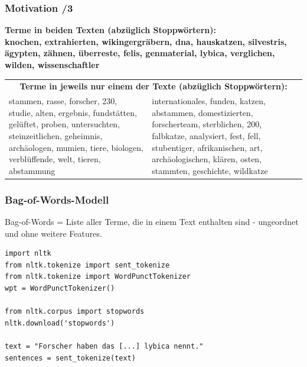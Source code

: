     \begin{frame}
    \frametitle{Motivation /3}
    \begin{center}
    \scriptsize{\textbf{Terme in beiden Texten (abzüglich Stoppwörtern):\\knochen, extrahierten, wikingergräbern, dna, hauskatzen, silvestris, ägypten, zähnen, überreste, felis, genmaterial, lybica, verglichen, wilden, wissenschaftler}}
    \end{center}
    
    \begin{table}[htp]
    \begin{center}
    \begin{tabular}{p{5cm}p{5cm}}
    \multicolumn{2}{c}{\scriptsize{\textbf{Terme in jeweils nur einem der Texte (abzüglich Stoppwörtern):}}}\\
    \scriptsize{stammen, rasse, forscher, 230, studie, alten, ergebnis, fundstätten, gelüftet, proben, untersuchten, steinzeitlichen, geheimnis, archäologen, mumien, tiere, biologen, verblüffende, welt, tieren, abstammung} & \scriptsize{internationales, funden, katzen, abstammen, domestizierten, forscherteam, sterblichen, 200, falbkatze, analysiert, fest, fell, stubentiger, afrikanischen, art, archäologischen, klären, osten, stammten, geschichte, wildkatze} \\
    \end{tabular}
    \end{center}
    \end{table}%
    
\end{frame}
    

\begin{frame}[fragile]
    \frametitle{Bag-of-Words-Modell}

    Bag-of-Words = Liste aller Terme, die in einem Text enthalten sind - ungeordnet und ohne weitere Features.

    \begin{verbatim}
import nltk
from nltk.tokenize import sent_tokenize
from nltk.tokenize import WordPunctTokenizer
wpt = WordPunctTokenizer()

from nltk.corpus import stopwords
nltk.download('stopwords')

text = "Forscher haben das [...] lybica nennt."
sentences = sent_tokenize(text)
    \end{verbatim}
\end{frame}

